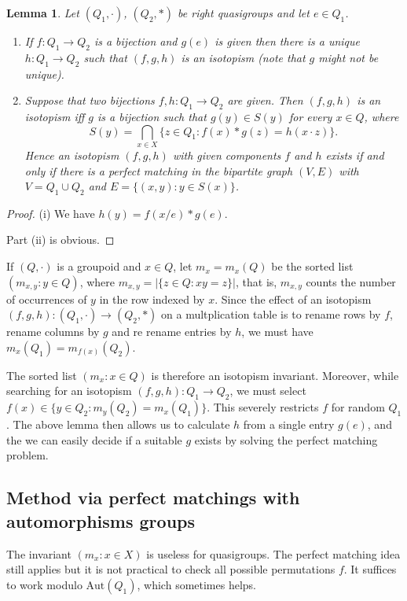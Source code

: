 \documentclass{amsart}
\def\rdiv{/}
\theoremstyle{plain}
\newtheorem{lemma}[theorem]{Lemma}
\theoremstyle{definition}
\begin{document}
\begin{lemma}
Let $(Q_1,\cdot)$, $(Q_2,*)$ be right quasigroups and let $e\in Q_1$.
\begin{enumerate}
\item[(i)] If $f:Q_1\to Q_2$ is a bijection and $g(e)$ is given then there is a unique $h:Q_1\to Q_2$ such that $(f,g,h)$ is an isotopism (note that $g$ might not be unique).
\item[(ii)] Suppose that two bijections $f,h:Q_1\to Q_2$ are given. Then $(f,g,h)$ is an isotopism iff $g$ is a bijection such that $g(y)\in S(y)$ for every $x\in Q$, where
\begin{displaymath}
	S(y) = \bigcap_{x\in X}\{z\in Q_1:f(x)*g(z) = h(x\cdot z)\}.
\end{displaymath}
Hence an isotopism $(f,g,h)$ with given components $f$ and $h$ exists if and only if there is a perfect matching in the bipartite graph $(V,E)$ with $V=Q_1\cup Q_2$ and $E=\{(x,y):y\in S(x)\}$.
\end{enumerate}
\end{lemma}
\begin{proof}
(i) We have $h(y) = f(x\rdiv e)*g(e)$.

Part (ii) is obvious.
\end{proof} 

If $(Q,\cdot)$ is a groupoid and $x\in Q$, let $m_x=m_x(Q)$ be the sorted list $(m_{x,y}:y\in Q)$, where $m_{x,y}=|\{z\in Q:xy=z\}|$, that is, $m_{x,y}$ counts the number of occurrences of $y$ in the row indexed by $x$. Since the effect of an isotopism $(f,g,h):(Q_1,\cdot)\to (Q_2,*)$ on a multplication table is to rename rows by $f$, rename columns by $g$ and re rename entries by $h$, we must have $m_x(Q_1) = m_{f(x)}(Q_2)$. 

The sorted list $(m_x:x\in Q)$ is therefore an isotopism invariant. Moreover, while searching for an isotopism $(f,g,h):Q_1\to Q_2$, we must select $f(x)\in\{y\in Q_2:m_y(Q_2)=m_x(Q_1)\}$. This severely restricts $f$ for random $Q_1$. The above lemma then allows us to calculate $h$ from a single entry $g(e)$, and the we can easily decide if a suitable $g$ exists by solving the perfect matching problem.

\subsection{Method via perfect matchings with automorphisms groups}

The invariant $(m_x:x\in X)$ is useless for quasigroups. The perfect matching idea still applies but it is not practical to check all possible permutations $f$. It suffices to work modulo $\mathrm{Aut}(Q_1)$, which sometimes helps.
\end{document}
